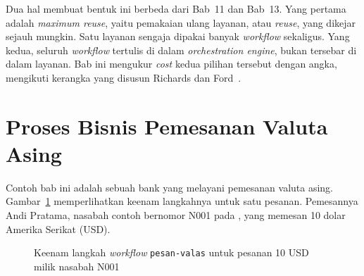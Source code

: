 Dua hal membuat bentuk ini berbeda dari Bab~11 dan Bab~13. Yang pertama adalah
\textit{maximum reuse}, yaitu
pemakaian ulang layanan, atau \textit{reuse}, yang
dikejar sejauh mungkin. Satu layanan sengaja dipakai banyak \textit{workflow}
sekaligus. Yang kedua, seluruh \textit{workflow} tertulis di dalam
\textit{orchestration engine}, bukan tersebar di dalam layanan. Bab ini
mengukur \textit{cost} kedua pilihan tersebut dengan angka, mengikuti kerangka
yang disusun Richards dan Ford~\cite{richards2020fundamentals}.

\section{Proses Bisnis Pemesanan Valuta Asing}

Contoh bab ini adalah sebuah bank yang melayani pemesanan valuta asing.
Gambar~\ref{fig:proses-odsoa} memperlihatkan keenam langkahnya untuk satu
pesanan. Pemesannya Andi Pratama, nasabah contoh bernomor N001 pada
, yang memesan 10 dolar Amerika Serikat
(USD).

\begin{figure}[htbp]
  \centering
  \caption{Keenam langkah \textit{workflow} \texttt{pesan-valas} untuk pesanan
    10 USD milik nasabah N001}
  \label{fig:proses-odsoa}
\end{figure}

